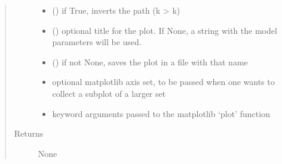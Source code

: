 \documentclass[letterpaper,10pt,english]{sphinxmanual}
\begin{document}
\begin{fulllineitems}
\begin{quote}
\begin{description}
\begin{itemize}
\item {} 
\sphinxAtStartPar
{} () \textendash{} if True, inverts the path (k \textendash{}\textgreater{} \sphinxhyphen{}k)

\item {} 
\sphinxAtStartPar
{} () \textendash{} optional title for the plot. If None, a string with the model parameters will be used.

\item {} 
\sphinxAtStartPar
{} () \textendash{} if not None, saves the plot in a file with that name

\item {} 
\sphinxAtStartPar
{} \textendash{} optional matplotlib axis set, to be passed when one wants to collect a subplot of a larger set

\item {} 
\sphinxAtStartPar
{} \textendash{} keyword arguments passed to the matplotlib ‘plot’ function

\end{itemize}

\item[{Returns}] \leavevmode
\sphinxAtStartPar
None

\end{description}\end{quote}

\end{fulllineitems}

\end{document}
